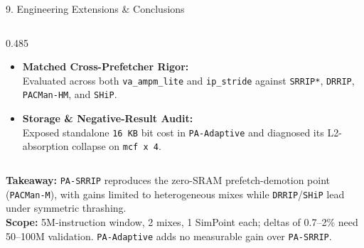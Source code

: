 \documentclass[aspectratio=169, 10pt]{beamer}
\begin{document}
\begin{frame}{9. Engineering Extensions \& Conclusions}
\begin{columns}[t, onlytextwidth]
\begin{column}{0.485\textwidth}
\begin{tcolorbox}[tealpanel, top=1.1mm, bottom=1.1mm]
\begin{itemize}
          \item \textbf{Matched Cross-Prefetcher Rigor:}\\
            Evaluated across both \texttt{va\_ampm\_lite} and \texttt{ip\_stride} against \texttt{SRRIP*}, \texttt{DRRIP}, \texttt{PACMan-HM}, and \texttt{SHiP}.
          \item \textbf{Storage \& Negative-Result Audit:}\\
            Exposed standalone \texttt{16\,KB} bit cost in \texttt{PA-Adaptive} and diagnosed its L2-absorption collapse on \texttt{mcf x 4}.
        \end{itemize}
      \end{tcolorbox}
    \end{column}
  \end{columns}

  \vspace{0.08cm}
  \begin{tcolorbox}[summarystrip, top=0.9mm, bottom=0.9mm]
    \scriptsize
    \textbf{\color{NavyPrimary}Takeaway:} \texttt{PA-SRRIP} reproduces the zero-SRAM prefetch-demotion point (\texttt{PACMan-M}), with gains limited to heterogeneous mixes while \texttt{DRRIP}/\texttt{SHiP} lead under symmetric thrashing.\\[0.05cm]
    \textbf{\color{Obsidian}Scope:} 5M-instruction window, 2 mixes, 1 SimPoint each; deltas of 0.7--2\% need 50--100M validation. \texttt{PA-Adaptive} adds no measurable gain over \texttt{PA-SRRIP}.
  \end{tcolorbox}
\end{frame}
\end{document}
